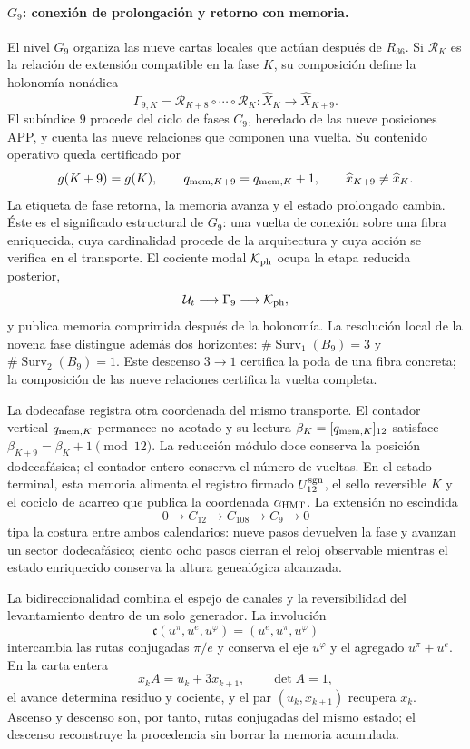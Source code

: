\paragraph{\(G_9\): conexión de prolongación y retorno con memoria.}
El nivel \(G_9\) organiza las nueve cartas locales que actúan después de
\(R_{36}\). Si \(\mathcal R_K\) es la relación de extensión compatible en
la fase \(K\), su composición define la holonomía nonádica
\[
 \Gamma_{9,K}
 =\mathcal R_{K+8}\circ\cdots\circ\mathcal R_K:
 \widehat X_K\longrightarrow\widehat X_{K+9}.
\]
El subíndice \(9\) procede del ciclo de fases \(C_9\), heredado de las nueve
posiciones APP, y cuenta las nueve relaciones que componen una vuelta. Su
contenido operativo queda certificado por
\[
 g(K+9)=g(K),\qquad
 q_{{\rm mem},K+9}=q_{{\rm mem},K}+1,
 \qquad
 \widehat x_{K+9}\ne\widehat x_K.
\]
La etiqueta de fase retorna, la memoria avanza y el estado prolongado cambia.
Éste es el significado estructural de \(G_9\): una vuelta de conexión sobre
una fibra enriquecida, cuya cardinalidad procede de la arquitectura y cuya
acción se verifica en el transporte. El cociente modal \(\mathcal K_{\rm ph}\)
ocupa la etapa reducida posterior,
\[
 \mathcal U_t\longrightarrow\Gamma_9\longrightarrow\mathcal K_{\rm ph},
\]
y publica memoria comprimida después de la holonomía.
La resolución local de la novena fase distingue además dos horizontes:
\(\#\operatorname{Surv}_1(B_9)=3\) y
\(\#\operatorname{Surv}_2(B_9)=1\). Este descenso \(3\to1\) certifica la
poda de una fibra concreta; la composición de las nueve relaciones certifica
la vuelta completa.

La dodecafase registra otra coordenada del mismo transporte. El contador
vertical \(q_{{\rm mem},K}\) permanece no acotado y su lectura
\(\beta_K=[q_{{\rm mem},K}]_{12}\) satisface
\(\beta_{K+9}=\beta_K+1\pmod{12}\). La reducción módulo doce conserva la
posición dodecafásica; el contador entero conserva el número de vueltas. En
el estado terminal, esta memoria alimenta el registro firmado
\(U_{12}^{\rm sgn}\), el sello reversible \(K\) y el cociclo de acarreo que
publica la coordenada \(\alpha_{\rm HMT}\).
La extensión no escindida
\[
 0\longrightarrow C_{12}\longrightarrow C_{108}
 \longrightarrow C_9\longrightarrow0
\]
tipa la costura entre ambos calendarios: nueve pasos devuelven la fase y
avanzan un sector dodecafásico; ciento ocho pasos cierran el reloj observable
mientras el estado enriquecido conserva la altura genealógica alcanzada.

La bidireccionalidad combina el espejo de canales y la reversibilidad del
levantamiento dentro de un solo generador. La involución
\[
 \mathfrak c(u^\pi,u^e,u^\varphi)
 =(u^e,u^\pi,u^\varphi)
\]
intercambia las rutas conjugadas \(\pi/e\) y conserva el eje
\(u^\varphi\) y el agregado \(u^\pi+u^e\). En la carta entera
\[
 x_kA=u_k+3x_{k+1},\qquad \det A=1,
\]
el avance determina residuo y cociente, y el par \((u_k,x_{k+1})\) recupera
\(x_k\). Ascenso y descenso son, por tanto, rutas conjugadas del mismo estado;
el descenso reconstruye la procedencia sin borrar la memoria acumulada.

